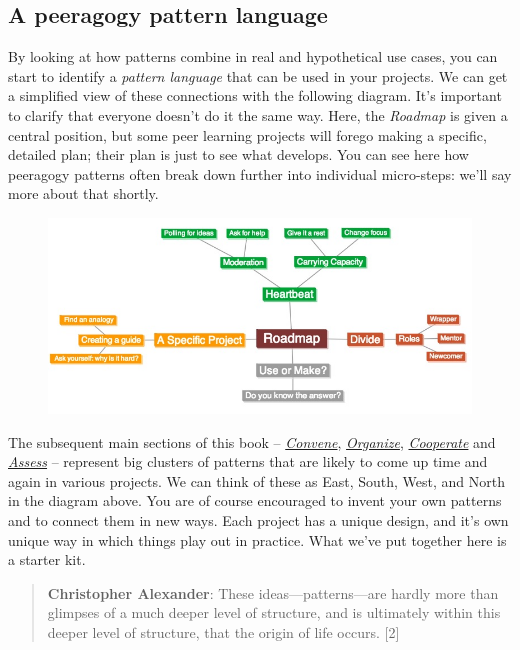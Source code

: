 \subsection{A peeragogy pattern language}

By looking at how patterns combine in real and hypothetical use cases,
you can start to identify a \emph{pattern language} that can be used in
your projects. We can get a simplified view of these connections with
the following diagram. It's important to clarify that everyone doesn't
do it the same way. Here, the \emph{Roadmap} is given a central
position, but some peer learning projects will forego making a specific,
detailed plan; their plan is just to see what develops. You can see here
how peeragogy patterns often break down further into individual
micro-steps: we'll say more about that shortly.

\begin{figure}[htbp]
\centering
\includegraphics[width=\textwidth]{../pictures/pattern-map1.jpg}
\end{figure}

The subsequent main sections of this book --
\href{http://peeragogy.org/convene/}{\emph{Convene}},
\href{http://peeragogy.org/organize/}{\emph{Organize}},
\href{http://peeragogy.org/facilitate/}{\emph{Cooperate}} and
\href{http://peeragogy.org/assessment/}{\emph{Assess}} -- represent big
clusters of patterns that are likely to come up time and again in
various projects. We can think of these as East, South, West, and North
in the diagram above. You are of course encouraged to invent your own
patterns and to connect them in new ways. Each project has a unique
design, and it's own unique way in which things play out in practice.
What we've put together here is a starter kit.

\begin{quote}
\textbf{Christopher Alexander}: These ideas---patterns---are hardly more
than glimpses of a much deeper level of structure, and is ultimately
within this deeper level of structure, that the origin of life occurs.
{[}2{]}
\end{quote}
